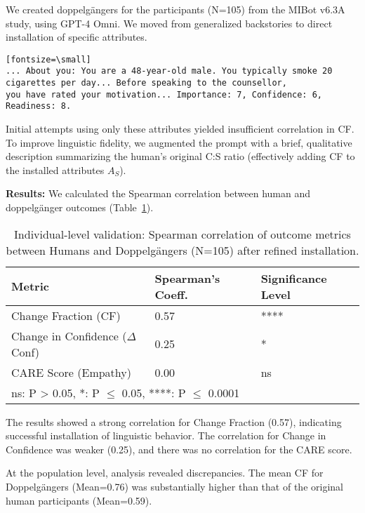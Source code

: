We created doppelgängers for the participants (N=105) from the MIBot v6.3A study, using GPT-4 Omni. We moved from generalized backstories to direct installation of specific attributes.

\begin{verbatim}[fontsize=\small]
... About you: You are a 48-year-old male. You typically smoke 20
cigarettes per day... Before speaking to the counsellor,
you have rated your motivation... Importance: 7, Confidence: 6, Readiness: 8.
\end{verbatim}

Initial attempts using only these attributes yielded insufficient correlation in CF. To improve linguistic fidelity, we augmented the prompt with a brief, qualitative description summarizing the human's original C:S ratio (effectively adding CF to the installed attributes $A_S$).

\textbf{Results:} We calculated the Spearman correlation between human and doppelgänger outcomes (Table~\ref{tab:doppelganger-correlations}).

\begin{table}[h!]
\centering
\caption{Individual-level validation: Spearman correlation of outcome metrics between Humans and Doppelgängers (N=105) after refined installation.}
\label{tab:doppelganger-correlations}
\begin{tabular}{@{}lll@{}}
\toprule
\textbf{Metric} & \textbf{Spearman's Coeff.} & \textbf{Significance Level} \\ \midrule
Change Fraction (CF) & 0.57 & **** \\
Change in Confidence ($\Delta$Conf) & 0.25 & * \\
CARE Score (Empathy) & 0.00 & ns \\ \bottomrule
\multicolumn{3}{l}{\footnotesize{ns: P > 0.05, *: P $\le$ 0.05, ****: P $\le$ 0.0001}}
\end{tabular}
\end{table}

The results showed a strong correlation for Change Fraction (0.57), indicating successful installation of linguistic behavior. The correlation for Change in Confidence was weaker (0.25), and there was no correlation for the CARE score.

At the population level, analysis revealed discrepancies. The mean CF for Doppelgängers (Mean=0.76) was substantially higher than that of the original human participants (Mean=0.59).

